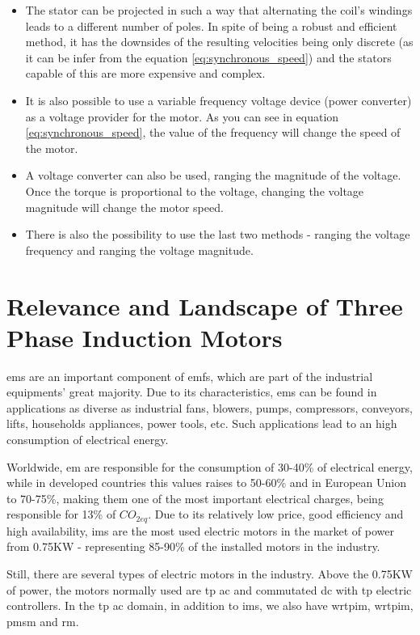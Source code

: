\begin{itemize}
  \item 
  The stator can be projected in such a way that alternating the coil's windings leads to a different number of poles. In spite of being a robust and efficient method, it has the downsides of the resulting velocities being only discrete (as it can be infer from the equation \ref{eq:synchronous_speed}) and the stators capable of this are more expensive and complex. 
  \item 
  It is also possible to use a variable frequency voltage device (power converter) as a voltage provider for the motor. As you can see in equation \ref{eq:synchronous_speed}, the value of the frequency will change the speed of the motor.
  \item 
  A voltage converter can also be used, ranging the magnitude of the voltage. Once the torque is proportional to the voltage, changing the voltage magnitude will change the motor speed.
  \item 
  There is also the possibility to use the last two methods - ranging the voltage frequency and ranging the voltage magnitude.
\end{itemize}

\section{Relevance and Landscape of Three Phase Induction Motors} %
\label{sec:tpin_relevance}

\acrshort{em}s are an important component of \acrshort{emfs}, which are part of the industrial equipments' great majority. Due to its characteristics, \acrshort{em}s can be found in applications as diverse as industrial fans, blowers, pumps, compressors, conveyors, lifts, households appliances, power tools, etc. 
Such applications lead to an high consumption of electrical energy.

Worldwide, \acrshort{em} are responsible for the consumption of 30-40\% of electrical energy, while in developed countries this values raises to 50-60\% and in European Union to 70-75\%, making them one of the most important electrical charges, being responsible for 13\% of $CO_{2eq}$. 
Due to its relatively low price, good efficiency and high availability, \acrshort{ims}  are the most used electric motors in the market of power from 0.75KW - representing 85-90\% of the installed motors in the industry. 

Still, there are several types of electric motors in the industry. Above the 0.75KW of power, the motors normally used are \acrfull{tp} \acrshort{ac} and commutated \acrshort{dc} with \acrshort{tp} electric controllers.
In the \acrshort{tp} \acrshort{ac} domain, in addition to \acrshort{ims}, we also have \acrfull{wrtpim}, \acrfull{wrtpim}, \acrfull{pmsm} and \acrfull{rm}. 

